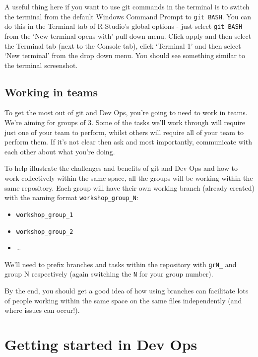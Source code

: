\documentclass[
  12pt,
]{article}
\providecommand{\tightlist}{%
  \setlength{\itemsep}{0pt}\setlength{\parskip}{0pt}}
\begin{document}
A useful thing here if you want to use git commands in the terminal is
to switch the terminal from the default Windows Command Prompt to
\texttt{git\ BASH}. You can do this in the Terminal tab of R-Studio's
global options - just select \texttt{git\ BASH} from the `New terminal
opens with' pull down menu. Click apply and then select the Terminal tab
(next to the Console tab), click `Terminal 1' and then select `New
terminal' from the drop down menu. You should see something similar to
the terminal screenshot.

\hypertarget{working-in-teams}{%
\subsection{Working in teams}\label{working-in-teams}}

To get the most out of git and Dev Ops, you're going to need to work in
teams. We're aiming for groups of 3. Some of the tasks we'll work
through will require just one of your team to perform, whilst others
will require all of your team to perform them. If it's not clear then
ask and most importantly, communicate with each other about what you're
doing.

To help illustrate the challenges and benefits of git and Dev Ops and
how to work collectively within the same space, all the groups will be
working within the same repository. Each group will have their own
working branch (already created) with the naming format
\texttt{workshop\_group\_N}:

\begin{itemize}
\tightlist
\item
  \texttt{workshop\_group\_1}
\item
  \texttt{workshop\_group\_2}
\item
  \ldots{}
\end{itemize}

We'll need to prefix branches and tasks within the repository with
\texttt{grN\_} and group N respectively (again switching the \texttt{N}
for your group number).

By the end, you should get a good idea of how using branches can
facilitate lots of people working within the same space on the same
files independently (and where issues can occur!).

\newpage

\hypertarget{getting-started-in-dev-ops}{%
\section{Getting started in Dev Ops}\label{getting-started-in-dev-ops}}
\end{document}
